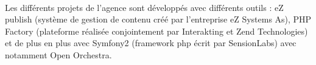         \paragraph{}
        Les différents projets de l'agence sont développés avec différents outils : eZ publish (système de gestion de contenu créé par l'entreprise eZ Systems As), PHP Factory (plateforme réalisée conjointement par Interakting et Zend Technologies) et de plus en plus avec Symfony2 (framework php écrit par SensionLabs) avec notamment Open Orchestra.

        
        
        